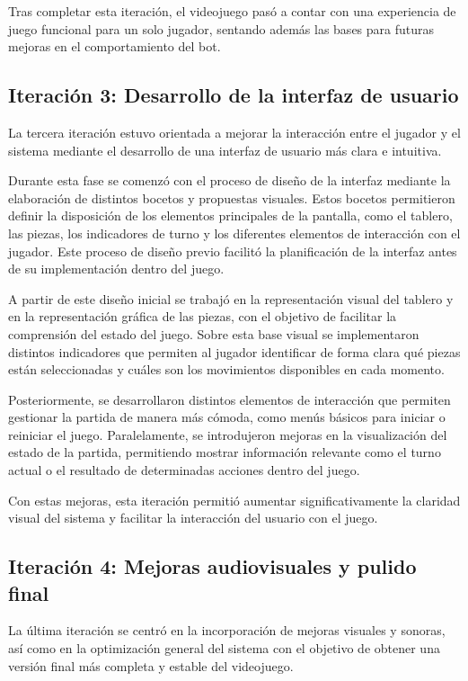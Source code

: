 Tras completar esta iteración, el videojuego pasó a contar con una experiencia de juego funcional para un solo jugador, sentando además las bases para futuras mejoras en el comportamiento del bot.

\subsection{Iteración 3: Desarrollo de la interfaz de usuario}

La tercera iteración estuvo orientada a mejorar la interacción entre el jugador y el sistema mediante el desarrollo de una interfaz de usuario más clara e intuitiva.

Durante esta fase se comenzó con el proceso de diseño de la interfaz mediante la elaboración de distintos bocetos y propuestas visuales. Estos bocetos permitieron definir la disposición de los elementos principales de la pantalla, como el tablero, las piezas, los indicadores de turno y los diferentes elementos de interacción con el jugador. Este proceso de diseño previo facilitó la planificación de la interfaz antes de su implementación dentro del juego.

A partir de este diseño inicial se trabajó en la representación visual del tablero y en la representación gráfica de las piezas, con el objetivo de facilitar la comprensión del estado del juego. Sobre esta base visual se implementaron distintos indicadores que permiten al jugador identificar de forma clara qué piezas están seleccionadas y cuáles son los movimientos disponibles en cada momento.

Posteriormente, se desarrollaron distintos elementos de interacción que permiten gestionar la partida de manera más cómoda, como menús básicos para iniciar o reiniciar el juego. Paralelamente, se introdujeron mejoras en la visualización del estado de la partida, permitiendo mostrar información relevante como el turno actual o el resultado de determinadas acciones dentro del juego.

Con estas mejoras, esta iteración permitió aumentar significativamente la claridad visual del sistema y facilitar la interacción del usuario con el juego.

\subsection{Iteración 4: Mejoras audiovisuales y pulido final}

La última iteración se centró en la incorporación de mejoras visuales y sonoras, así como en la optimización general del sistema con el objetivo de obtener una versión final más completa y estable del videojuego.

